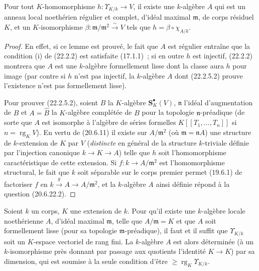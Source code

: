 \begin{lemma}[22.2.5.2]
\label{0.22.2.5.2-fr}
Pour tout $K$-homomorphisme $h:\Upsilon_{K/k}\to V$, il existe une
$k$-algèbre $A$ qui est un anneau local noethérien régulier et complet,
d'idéal maximal $\mathfrak m$, de corps résiduel $K$, et un $K$-isomorphisme
$\beta:\mathfrak m/\mathfrak m^2\xrightarrow{\sim}V$ tels que
$h=\beta\circ\chi_{A/k}$.
\end{lemma}

\begin{proof}
En effet, si ce lemme est prouvé, le fait que $A$ est régulier entraîne que
la condition (i) de (22.2.2) est satisfaite (17.1.1)~; si en outre $h$ est
injectif, (22.2.2) montrera que $A$ est une $k$-algèbre formellement lisse
dont la classe aura $h$ pour image (par contre si $h$ n'est pas injectif, la
$k$-algèbre $A$ dont (22.2.5.2) prouve l'existence n'est pas formellement
lisse).

Pour prouver (22.2.5.2), soient $B$ la $K$-algèbre $\mathbf S_K^\bullet(V)$,
$\mathfrak n$ l'idéal d'augmentation de $B$ et $A=\widehat B$ la
$K$-algèbre complétée de $B$ pour la topologie $\mathfrak n$-préadique (de
sorte que $A$ est isomorphe à l'algèbre de séries formelles
$K[[T_1,\ldots,T_n]]$ si $n=\operatorname{rg}_KV$). En vertu de (20.6.11)
il existe sur $A/\mathfrak m^2$ (où $\mathfrak m=\mathfrak nA$) une structure
de $k$-extension de $K$ par $V$ (\emph{distincte} en général de la structure
$k$-triviale définie par l'injection canonique $k\to K\to A$) telle que $h$
soit l'homomorphisme caractéristique de cette extension. Si
$f:k\to A/\mathfrak m^2$ est l'homomorphisme structural, le fait que $k$
soit séparable sur le corps premier permet (19.6.1) de factoriser $f$ en
$k\xrightarrow{g}A\to A/\mathfrak m^2$, et la $k$-algèbre $A$ ainsi définie
répond à la question (20.6.22.2).
\end{proof}

\begin{theorem}[22.2.6]
\label{0.22.2.6-fr}
Soient $k$ un corps, $K$ une extension de $k$. Pour qu'il existe une
$k$-algèbre locale noethérienne $A$, d'idéal maximal $\mathfrak m$, telle que
$A/\mathfrak m=K$ et que $A$ soit formellement lisse (pour sa topologie
$\mathfrak m$-préadique), il faut et il suffit que $\Upsilon_{K/k}$ soit un
$K$-espace vectoriel de rang fini. La $k$-algèbre $A$ est alors déterminée
(à un $k$-isomorphisme près donnant par passage aux quotients l'identité
$K\to K$) par sa dimension, qui est soumise à la seule condition d'être
$\geqslant\operatorname{rg}_K\Upsilon_{K/k}$.
\end{theorem}

